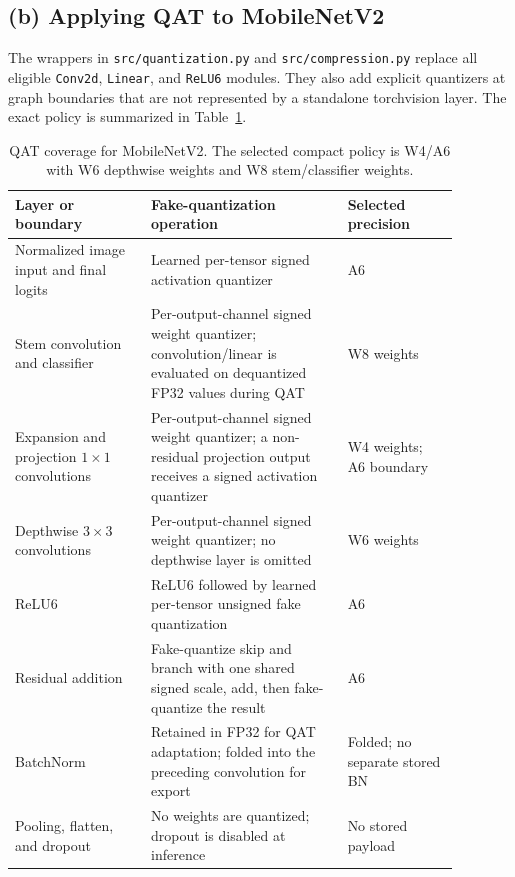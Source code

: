 \subsection{(b) Applying QAT to MobileNetV2}

The wrappers in \texttt{src/quantization.py} and
\texttt{src/compression.py} replace all eligible \texttt{Conv2d},
\texttt{Linear}, and \texttt{ReLU6} modules. They also add explicit
quantizers at graph boundaries that are not represented by a standalone
torchvision layer. The exact policy is summarized in
Table~\ref{tab:q2-coverage}.

\begin{table}[H]
    \centering
    \small
    \caption{QAT coverage for MobileNetV2. The selected compact policy is W4/A6 with W6 depthwise weights and W8 stem/classifier weights.}
    \label{tab:q2-coverage}
    \begin{tabular}{p{0.27\linewidth}p{0.39\linewidth}p{0.22\linewidth}}
        \toprule
        Layer or boundary & Fake-quantization operation & Selected precision \\
        \midrule
        Normalized image input and final logits & Learned per-tensor signed activation quantizer & A6 \\
        Stem convolution and classifier & Per-output-channel signed weight quantizer; convolution/linear is evaluated on dequantized FP32 values during QAT & W8 weights \\
        Expansion and projection $1\times1$ convolutions & Per-output-channel signed weight quantizer; a non-residual projection output receives a signed activation quantizer & W4 weights; A6 boundary \\
        Depthwise $3\times3$ convolutions & Per-output-channel signed weight quantizer; no depthwise layer is omitted & W6 weights \\
        ReLU6 & ReLU6 followed by learned per-tensor unsigned fake quantization & A6 \\
        Residual addition & Fake-quantize skip and branch with one shared signed scale, add, then fake-quantize the result & A6 \\
        BatchNorm & Retained in FP32 for QAT adaptation; folded into the preceding convolution for export & Folded; no separate stored BN \\
        Pooling, flatten, and dropout & No weights are quantized; dropout is disabled at inference & No stored payload \\
        \bottomrule
    \end{tabular}
\end{table}

